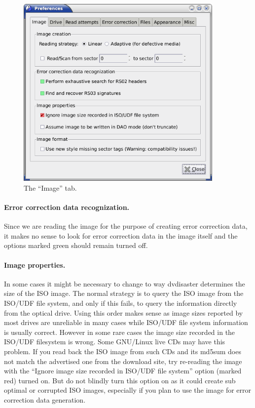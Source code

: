 \vspace{-4mm}
\begin{figure}[h]
\centerline{\includegraphics[width=0.9\textwidth]{screenshots/eccfile-prefs-image-adv.png}}
\caption{The ``Image'' tab.}  
\label{howto-eccfile-prefs-image-adv}
\end{figure}
\vspace{-6mm}

\paragraph{Error correction data recognization.} Since
we are reading the image for the purpose of creating error correction data, it
makes no sense to look for error correction data in the image itself and the options
marked green should remain turned off.

\paragraph{Image properties.} In some cases it might be necessary to change to way
dvdisaster determines the size of the ISO image. The normal strategy is to
query the ISO image from the ISO/UDF file system, and only if this fails,
to query the information directly from the optical drive. Using this order makes
sense as image sizes reported by most drives are unreliable in many cases while
ISO/UDF file system information is usually correct. However in some rare cases the
image size recorded in the ISO/UDF filesystem is wrong. Some GNU/Linux live CDs may have
this problem. If you read back the ISO image from such CDs and its md5sum does not
match the advertised one from the download site, try re-reading the image with
the ``Ignore image size recorded in ISO/UDF file system'' option (marked red)
turned on. But do not blindly turn this option on as it could
create sub optimal or corrupted ISO images, especially if you plan to use the
image for error correction data generation. 

